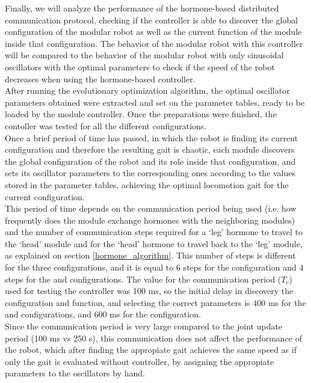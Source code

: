Finally, we will analyze the performance of the hormone-based distributed communication protocol, checking if the controller is able to discover the global configuration of the modular robot as well as the current function of the module inside that configuration. The behavior of the modular robot with this controller will be compared to the behavior of the modular robot with only sinusoidal oscillators with the optimal parameters to check if the speed of the robot decreases when using the hormone-based controller.\\

After running the evolutionary optimization algorithm, the optimal oscillator parameters obtained were extracted and set on the parameter tables, ready to be loaded by the module controller. Once the preparations were finished, the contoller was tested for all the different configurations.\\

Once a brief period of time has passed, in which the robot is finding its current configuration and therefore the resulting gait is chaotic, each module discovers the global configuration of the robot and its role inside that configuration, and sets its oscillator parameters to the corresponding ones according to the values stored in the parameter tables, achieving the optimal locomotion gait for the current configuration.\\

This period of time depends on the communication period being used (i.e. how frequently does the module exchange hormones with the neighboring modules) and the number of communication steps required for a `leg' hormone to travel to the `head' module and for the `head' hormone to travel back to the `leg' module, as explained on section \ref{hormone_algorithm}. This number of steps is different for the three configurations, and it is equal to 6 steps for the \emph{\robotEleven} configuration and 4 steps for the \emph{\robotSeven} and \emph{\robotNine} configurations. The value for the communication period ($T_c$) used for testing the controller was 100 ms, so the initial delay in discovery the configuration and function, and selecting the correct parameters is 400 ms for the \emph{\robotSeven} and \emph{\robotNine} configurations, and 600 ms for the \emph{\robotEleven} configuration.\\

Since the communication period is very large compared to the joint update period (100 ms vs 250 \micro s), this communication does not affect the performance of the robot, which after finding the appropiate gait achieves the same speed as if only the gait is evaluated without controller, by assigning the appropiate parameters to the oscillators by hand.\\ 

